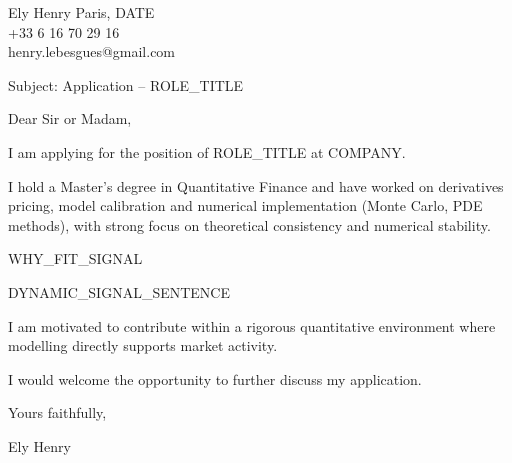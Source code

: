 \documentclass[10pt,a4paper]{article}
\begin{document}
\noindent Ely Henry \hfill Paris, {{DATE}} \\
+33 6 16 70 29 16 \\
henry.lebesgues@gmail.com \\

\vspace{1cm}

\noindent Subject: Application – {{ROLE_TITLE}}

\vspace{0.5cm}

Dear Sir or Madam,

\vspace{0.5cm}

I am applying for the position of {{ROLE_TITLE}} at {{COMPANY}}.

I hold a Master’s degree in Quantitative Finance and have worked on derivatives pricing, model calibration and numerical implementation (Monte Carlo, PDE methods), with strong focus on theoretical consistency and numerical stability.

{{WHY_FIT_SIGNAL}}

{{DYNAMIC_SIGNAL_SENTENCE}}

I am motivated to contribute within a rigorous quantitative environment where modelling directly supports market activity.

I would welcome the opportunity to further discuss my application.

Yours faithfully,

\vspace{1cm}

\noindent Ely Henry
\end{document}
